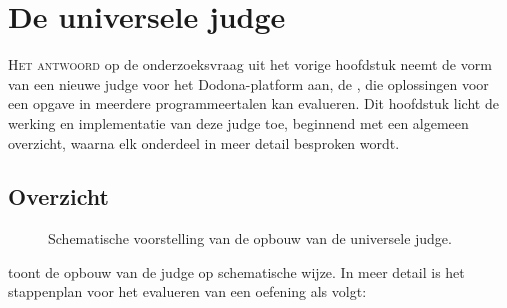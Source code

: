 \chapter{De universele judge}\label{ch:de-universele-judge}

\lettrine{H}{et antwoord} op de onderzoeksvraag uit het vorige hoofdstuk neemt de vorm van een nieuwe judge voor het Dodona-platform aan, de , die oplossingen voor een opgave in meerdere programmeertalen kan evalueren.
Dit hoofdstuk licht de werking en implementatie van deze judge toe, beginnend met een algemeen overzicht, waarna elk onderdeel in meer detail besproken wordt.

%
%


\section{Overzicht}\label{sec:overzicht}

\begin{figure}
    \begin{adjustbox}{width=\textwidth}
        
    \end{adjustbox}
    \caption{Schematische voorstelling van de opbouw van de universele judge.}
    \label{fig:universal-judge}
\end{figure}

 toont de opbouw van de judge op schematische wijze.
In meer detail is het stappenplan voor het evalueren van een oefening als volgt:

